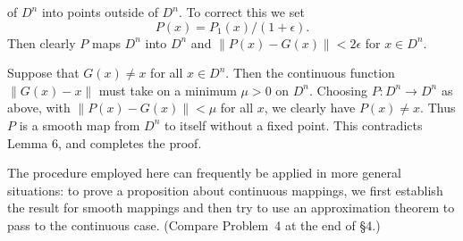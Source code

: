 
\begin{figure}[htbp]
\centering
\setcounter{figure}{3}%
\caption{}\label{fig:milnor-04}
\end{figure}

of $D^n$ into points outside of $D^n$. To correct this we set
\[
P(x) = P_1(x)/(1 + \epsilon).
\]
Then clearly $P$ maps $D^n$ into $D^n$ and $\|P(x) - G(x)\| < 2\epsilon$ for $x \in D^n$.

Suppose that $G(x) \neq x$ for all $x \in D^n$. Then the continuous function $\|G(x) - x\|$ must take on a minimum $\mu > 0$ on $D^n$. Choosing $P : D^n \to D^n$ as above, with $\|P(x) - G(x)\| < \mu$ for all $x$, we clearly have $P(x) \neq x$. Thus $P$ is a smooth map from $D^n$ to itself without a fixed point. This contradicts Lemma 6, and completes the proof.

The procedure employed here can frequently be applied in more general situations: to prove a proposition about continuous mappings, we first establish the result for smooth mappings and then try to use an approximation theorem to pass to the continuous case. (Compare Problem~4 at the end of \S4.)

